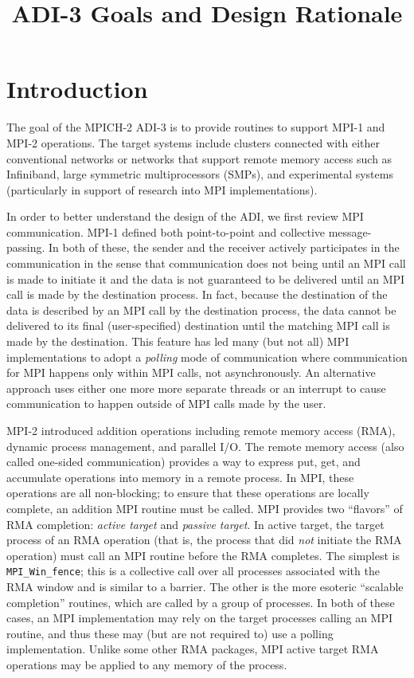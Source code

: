 \documentclass{article}
\def\code#1{\texttt{#1}}
\begin{document}
\title{ADI-3 Goals and Design Rationale}
\author{}
\maketitle

\begin{abstract}

\end{abstract}

\section{Introduction}
The goal of the MPICH-2 ADI-3 is to provide routines to support MPI-1
and MPI-2 operations.  The target systems include clusters connected
with either conventional networks or networks that support remote
memory access such as Infiniband, large symmetric multiprocessors
(SMPs), and experimental systems (particularly in support of research
into MPI implementations).  

In order to better understand the design of the ADI, we first review
MPI communication.  MPI-1 defined both point-to-point and collective
message-passing.  In both of these, the sender and the receiver
actively participates in the communication in the sense that
communication does not being until an MPI call is made to initiate it
and the data is not guaranteed to be delivered until an MPI call is
made by the destination process.  In fact, because the destination of
the data is described by an MPI call by the destination process, the
data cannot be delivered to its final (user-specified) destination
until the matching MPI call is made by the destination.  This feature
has led many (but not all) MPI implementations to adopt a
\emph{polling} mode of communication where communication for MPI
happens only within MPI calls, not asynchronously.  An alternative
approach uses either one more more separate threads or an interrupt to
cause communication to happen outside of MPI calls made by the user.

MPI-2 introduced addition operations including remote memory access (RMA),
dynamic process management, and parallel I/O.  The remote memory
access (also called one-sided communication) provides a way to express
put, get, and accumulate operations into memory in a remote process.
In MPI, these operations are all non-blocking; to ensure that these
operations are locally complete, an addition MPI routine must be
called.  MPI provides two ``flavors'' of RMA completion: \emph{active target}
and \emph{passive target}.  In active target, the target process of an
RMA operation (that is, the process that did \emph{not} initiate the
RMA operation) must call an MPI routine before the RMA completes.  The
simplest is \code{MPI_Win_fence}; this is a collective call over all
processes associated with the RMA window and is similar to a barrier.
The other is the more esoteric ``scalable completion'' routines, which
are called by a group of processes.  In both of these cases, an MPI
implementation may rely on the target processes calling an MPI
routine, and thus these may (but are not required to) use a polling
implementation.   Unlike some other RMA packages, MPI active target
RMA operations may be applied to any memory of the process.
\end{document}

